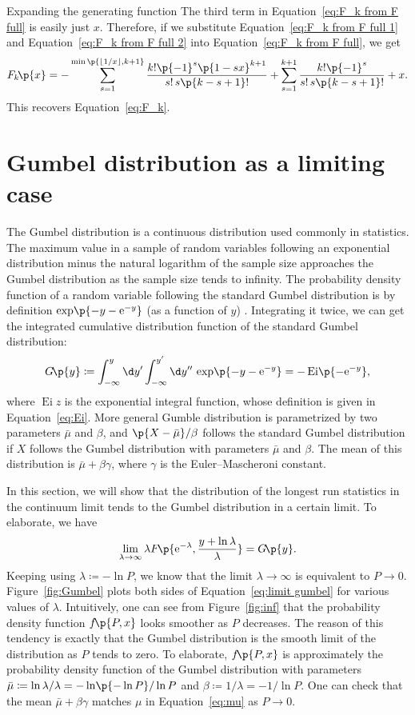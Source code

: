 \documentclass[oneside,12pt,final]{ucthesis-CA2012}
\newcommand{\mrm}[1]{\mathrm{#1}}
\newcommand{\gma}{\gamma}
\newcommand{\lmd}{\lambda}
\newcommand{\ceq}{\coloneqq}
\newcommand{\e}{\mrm{e}}
\newcommand{\fr}{\frac}
\newcommand{\opn}{\operatorname}
\newcommand{\fc}[2]{#1\mathchoice{\!}{\!}{}{}\p{#2}} %
\newcommand{\opc}[2]{\fc{\opn{#1}}{#2}} %
\newcommand\floor[1]{\left\lfloor#1\right\rfloor}
\begin{document}
\begin{mainmatter}
\begin{section}{Expanding the generating function}
The third term in Equation~\ref{eq:F_k from F full} is easily just $x$.
Therefore, if we substitute Equation~\ref{eq:F_k from F full 1}
and Equation~\ref{eq:F_k from F full 2} into Equation~\ref{eq:F_k from F full}, we get
\[\fc{F_k}x=-\sum_{s=1}^{\opc{min}{\floor{1/x},k+1}}\fr{k!\p{-1}^s\p{1-sx}^{k+1}}{s!\,s\p{k-s+1}!}
+\sum_{s=1}^{k+1}\fr{k!\p{-1}^s}{s!\,s\p{k-s+1}!}+x.\]
This recovers Equation~\ref{eq:F_k}.

\end{section}
\chapter{Gumbel distribution as a limiting case}

The Gumbel distribution is a continuous distribution used commonly in statistics.
The maximum value in a sample of random variables following an exponential distribution
minus the natural logarithm of the sample size approaches the Gumbel distribution
as the sample size tends to infinity.
The probability density function of a random variable following the standard Gumbel distribution
is by definition $\fc\exp{-y-\e^{-y}}$ (as a function of $y$) \cite{Gumbel_1941}.
Integrating it twice, we can get the integrated cumulative distribution function
of the standard Gumbel distribution:
\[\fc Gy\ceq\int_{-\infty}^y\d y'\int_{-\infty}^{y'}\d y''\,\fc\exp{-y-\e^{-y}}
=-\opc{Ei}{-\e^{-y}},\]
where $\opn{Ei}z$ is the exponential integral function,
whose definition is given in Equation~\ref{eq:Ei}.
More general Gumble distribution is parametrized by two parameters $\bar\mu$ and $\beta$,
and $\p{X-\bar\mu}/\beta$ follows the standard Gumbel distribution
if $X$ follows the Gumbel distribution with parameters $\bar\mu$ and $\beta$.
The mean of this distribution is $\bar\mu+\beta\gma$,
where $\gma$ is the Euler--Mascheroni constant.

In this section, we will show that the distribution of the longest run statistics
in the continuum limit tends to the Gumbel distribution in a certain limit.
To elaborate, we have
\begin{equation}
	\label{eq:limit gumbel}
	\lim_{\lmd\to\infty}\lmd\fc F{\e^{-\lmd},\fr{y+\ln\lmd}\lmd}=\fc Gy.
\end{equation}
Keeping using $\lmd\ceq-\ln P$, we know that the limit $\lmd\to\infty$ is equivalent to $P\to0$.
Figure~\ref{fig:Gumbel} plots both sides of Equation~\ref{eq:limit gumbel}
for various values of $\lmd$.
Intuitively, one can see from Figure~\ref{fig:inf}
that the probability density function $\fc f{P,x}$ looks smoother as $P$ decreases.
The reason of this tendency is exactly that
the Gumbel distribution is the smooth limit of the distribution as $P$ tends to zero.
To elaborate, $\fc f{P,x}$ is approximately
the probability density function of the Gumbel distribution
with parameters $\bar\mu\ceq\ln\lmd/\lmd=-\fc\ln{-\ln P}/\ln P$ and $\beta\ceq1/\lmd=-1/\ln P$.
One can check that the mean $\bar\mu+\beta\gma$ matches $\mu$
in Equation~\ref{eq:mu} as $P\to0$.


\end{mainmatter}
\end{document}
